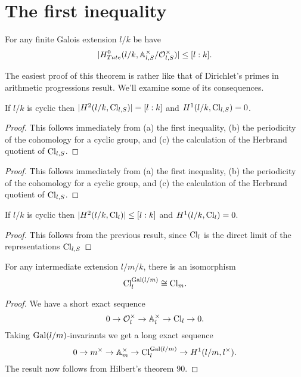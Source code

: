 \section{The first inequality}

\begin{theorem} \label{thm:first inequality}
	For any finite Galois extension $l/k$ be have
	\[
		|H^0_{Tate}(l/k, {\mathbb A}_{l,S}^\times / {\mathcal O}_{l,S}^\times) | \le [l : k].
	\]
\end{theorem}

The easiest proof of this theorem is rather like that of Dirichlet's primes in arithmetic
progressions result.
We'll examine some of its consequences.

\begin{corollary}
	If $l/k$ is cyclic then $|H^2(l/k, \mathrm{Cl}_{l,S})| = [l:k]$ and $H^1(l/k, \mathrm{Cl}_{l,S}) = 0$.
\end{corollary}

\begin{proof}
	This follows immediately from (a) the first inequality, (b) the periodicity of
	the cohomology for a cyclic group, and (c) the calculation of the Herbrand quotient
	of $\mathrm{Cl}_{l,S}$.
\end{proof}

\begin{proof}
	This follows immediately from (a) the first inequality, (b) the periodicity of
	the cohomology for a cyclic group, and (c) the calculation of the Herbrand quotient
	of $\mathrm{Cl}_{l,S}$.
\end{proof}

\begin{corollary}
	If $l/k$ is cyclic then $|H^2(l/k, \mathrm{Cl}_{l})| \le [l:k]$ and $H^1(l/k, \mathrm{Cl}_{l}) = 0$.
\end{corollary}

\begin{proof}
	This follows from the previous result, since $\mathrm{Cl}_l$ is the direct limit of
	the representations $\mathrm{Cl}_{l,S}$
\end{proof}


\begin{lemma}
	For any intermediate extension $l/m/k$, there is an isomorphism
	\[
		\mathrm{Cl}_{l}^{\mathrm{Gal}(l/m)} \cong \mathrm{Cl}_{m}.
	\]
\end{lemma}

\begin{proof}
	We have a short exact sequence
	\[
		0 \to {\mathcal O}_{l}^\times \to {\mathbb A}_{l}^\times \to \mathrm{Cl}_{l} \to 0.
	\]
	Taking $\mathrm{Gal}(l/m)$-invariants we get a long exact sequence
	\[
		0 \to m^\times \to {\mathbb A}_{m}^\times \to \mathrm{Cl}_{l}^{\mathrm{Gal}(l/m)} \to
		H^1(l/m,l^\times).
	\]
	The result now follows from Hilbert's theorem 90.
\end{proof}

